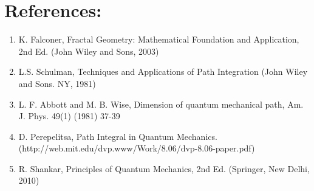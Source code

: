 \documentclass[14pt]{extarticle}
\begin{document}
\newpage

\section*{References:}

\begin{enumerate}


\item K. Falconer, Fractal Geometry: Mathematical Foundation and Application, 2nd Ed. (John Wiley and Sons, 2003)

\item L.S. Schulman, Techniques and Applications of Path Integration (John Wiley and Sons. NY, 1981)

\item L. F. Abbott and M. B. Wise, Dimension of quantum mechanical path, Am. J. Phys. 49(1) (1981) 37-39

\item D. Perepelitsa, Path Integral in Quantum Mechanics.\\ (http://web.mit.edu/dvp.www/Work/8.06/dvp-8.06-paper.pdf)

\item R. Shankar, Principles of Quantum Mechanics, 2nd Ed. (Springer, New Delhi, 2010)




\end{enumerate}
\end{document}
